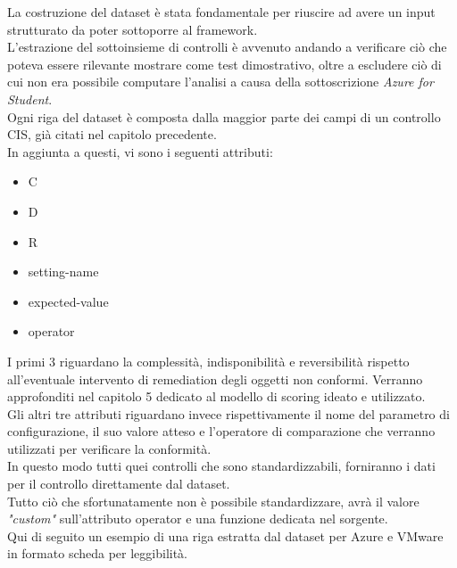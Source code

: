\documentclass[a4paper,11pt]{report}
\begin{document}
La costruzione del dataset è stata fondamentale per riuscire ad avere un input strutturato da poter sottoporre al framework. \\
L'estrazione del sottoinsieme di controlli è avvenuto andando a verificare ciò che poteva essere rilevante mostrare come test dimostrativo, oltre a escludere ciò di cui non era possibile computare l'analisi a causa della sottoscrizione \textit{Azure for Student}. \\

Ogni riga del dataset è composta dalla maggior parte dei campi di un controllo CIS, già citati nel capitolo precedente. \\
In aggiunta a questi, vi sono i seguenti attributi:
\begin{itemize}
 \item C
 \item D
 \item R
 \item setting-name
 \item expected-value
 \item operator 
 \end{itemize} 
 
 I primi 3 riguardano la complessità, indisponibilità e reversibilità rispetto all'eventuale intervento di remediation degli oggetti non conformi. Verranno approfonditi nel capitolo 5 dedicato al modello di scoring ideato e utilizzato. \\
Gli altri tre attributi riguardano invece rispettivamente il nome del parametro di configurazione, il suo valore atteso e l'operatore di comparazione che verranno utilizzati per verificare la conformità. \\
In questo modo tutti quei controlli che sono standardizzabili, forniranno i dati per il controllo direttamente dal dataset. \\
Tutto ciò che sfortunatamente non è possibile standardizzare, avrà il valore \textit{"custom"} sull'attributo operator e una funzione dedicata nel sorgente. \\

Qui di seguito un esempio di una riga estratta dal dataset per Azure e VMware in formato scheda per leggibilità. \\
\end{document}
